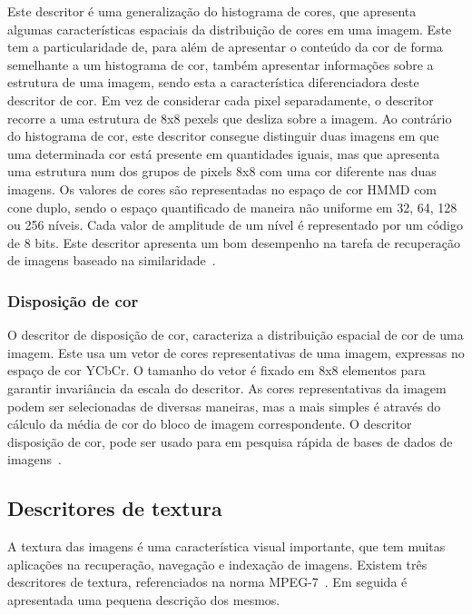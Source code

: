Este descritor é uma generalização do histograma de cores, que apresenta algumas características espaciais da distribuição de cores em uma imagem. Este tem a particularidade de, para além de apresentar o conteúdo da cor de forma semelhante a um histograma de cor, também apresentar informações sobre a estrutura de uma imagem, sendo esta a característica diferenciadora deste descritor de cor. Em vez de considerar cada pixel separadamente, o descritor recorre a uma estrutura de 8x8 pexels que desliza sobre a imagem. Ao contrário do histograma de cor, este descritor consegue distinguir duas imagens em que uma determinada cor está presente em quantidades iguais, mas que apresenta uma estrutura num dos grupos de pixels 8x8 com uma cor diferente nas duas imagens. Os valores de cores são representadas no espaço de cor HMMD com cone duplo, sendo o espaço quantificado de maneira não uniforme em 32, 64, 128 ou 256 níveis. 
Cada valor de amplitude de um nível é representado por um código de 8 bits. Este descritor apresenta um bom desempenho na tarefa de recuperação de imagens baseado na similaridade~\cite{Modi2008}.

\subsubsection{Disposição de cor}

O descritor de disposição de cor, caracteriza a distribuição espacial de cor de uma imagem. Este usa um vetor de cores representativas de uma imagem, expressas no espaço de cor YCbCr. O tamanho do vetor é fixado em 8x8 elementos para garantir invariância da escala do descritor. As cores representativas da imagem podem ser selecionadas de diversas maneiras, mas a mais simples é através do cálculo da média de cor do bloco de imagem correspondente. O descritor disposição de cor, pode ser usado para em pesquisa rápida de bases de dados de imagens~\cite{Cieplinski2001}.


\subsection{Descritores de textura}

A textura das imagens é uma característica visual importante, que tem muitas aplicações na recuperação, navegação e indexação de imagens. Existem três descritores de textura, referenciados na norma MPEG-7~\cite{Wu2001}. Em seguida é apresentada uma pequena descrição dos mesmos.

